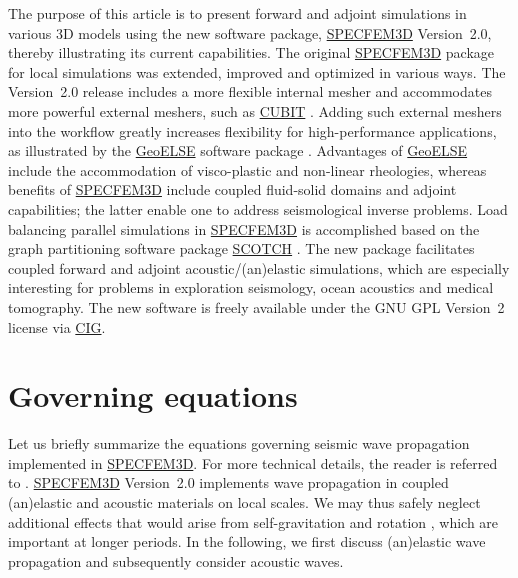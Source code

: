 \documentclass[referee,extra]{gji}
\begin{document}
The purpose of this article is to present forward and adjoint simulations in various 3D models using the new software package, \href{http://www.geodynamics.org/cig/software/specfem3d}{SPECFEM3D} Version~2.0, thereby illustrating its current capabilities.
The original \href{http://www.geodynamics.org/cig/software/specfem3d}{SPECFEM3D} package for local simulations was extended, improved and optimized in various ways.
The Version~2.0 release includes a more flexible internal mesher and accommodates more powerful external meshers,
such as \href{http://cubit.sandia.gov}{CUBIT}
\citep{Bl94,WhMiBe95,Mi96,CaStLeKoPiTr08}.
Adding such external meshers into the workflow greatly increases flexibility for high-performance applications,
as illustrated by the \href{http://geoelse.stru.polimi.it/}{GeoELSE} software package \citep{CaGa97,StPaIg09,ChMoTsBaKrKaStKr10}.
Advantages of \href{http://geoelse.stru.polimi.it/}{GeoELSE} include the accommodation of visco-plastic and non-linear rheologies,
whereas benefits of \href{http://www.geodynamics.org/cig/software/specfem3d}{SPECFEM3D} include coupled fluid-solid domains and
adjoint capabilities; the latter enable one to address seismological inverse problems.
Load balancing parallel simulations in \href{http://www.geodynamics.org/cig/software/specfem3d}{SPECFEM3D} is accomplished based on the graph partitioning
software package \href{http://www.labri.fr/perso/pelegrin/scotch/}{SCOTCH}
\citep{PeRo96,ChPe08}.
The new package facilitates coupled forward and adjoint acoustic/(an)elastic simulations,
which are especially interesting for problems in exploration seismology, ocean acoustics and medical tomography.
The new software is freely available under the GNU GPL Version~2 license via \href{http://www.geodynamics.org}{CIG}.

\section{Governing equations}\label{sec:Method}

Let us briefly summarize the equations governing seismic wave propagation implemented in \href{http://www.geodynamics.org/cig/software/specfem3d}{SPECFEM3D}.
For more technical details, the reader is referred to \citet{KoTr99}.
\href{http://www.geodynamics.org/cig/software/specfem3d}{SPECFEM3D} Version~2.0 implements wave propagation in coupled (an)elastic and acoustic materials
on local scales.
We may thus safely neglect additional effects that would arise from self-gravitation and rotation
\citep{KoTr02b,KoTsTr05,ChKoViCaVaFe07}, which are important at longer periods.
In the following, we first discuss (an)elastic wave propagation and subsequently consider acoustic waves.
\end{document}
